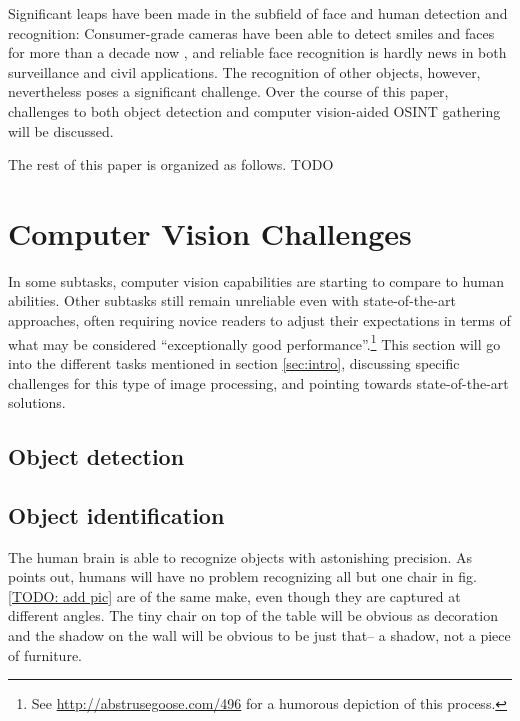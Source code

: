 \documentclass[twoside,a4paper]{article}
\begin{document}
Significant leaps have been made in the subfield of face and human detection and recognition: Consumer-grade cameras have been able to detect smiles and faces for more than a decade now , and reliable face recognition is hardly news in both surveillance and civil applications.
The recognition of other objects, however, nevertheless poses a significant challenge. Over the course of this paper, challenges to both object detection and computer vision-aided OSINT gathering will be discussed.

The rest of this paper is organized as follows. TODO

\section{Computer Vision Challenges}
\label{sec:object_det}
In some subtasks, computer vision capabilities are starting to compare to human abilities. Other subtasks still remain unreliable even with state-of-the-art approaches, often requiring novice readers to adjust their expectations in terms of what may be considered ``exceptionally good performance''.\footnote{See \url{http://abstrusegoose.com/496} for a humorous depiction of this process.} %
This section will go into the different tasks mentioned in section \ref{sec:intro}, discussing specific challenges for this type of image processing, and pointing towards state-of-the-art solutions. 

\subsection{Object detection}
\label{sec:object_det}


\subsection{Object identification}
\label{sec:object_id}
The human brain is able to recognize objects with astonishing precision. As \cite{liter_or_into} points out, humans will have no problem recognizing all but one chair in fig. \ref{TODO: add pic} are of the same make, even though they are captured at different angles. The tiny chair on top of the table will be obvious as decoration and the shadow on the wall will be obvious to be just that-- a shadow, not a piece of furniture.
\end{document}
